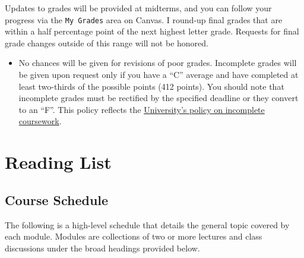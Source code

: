 \documentclass[
]{book}
\newenvironment{rmdblock}[1]
  {\begin{shaded*}
  \begin{itemize}
  \renewcommand{\labelitemi}{
    \raisebox{-.7\height}[0pt][0pt]{
      {\setkeys{Gin}{width=3em,keepaspectratio}\texttt{[image: images/\#1]}}
    }
  }
  \item
  }
  {
  \end{itemize}
  \end{shaded*}
  }
\newenvironment{rmdwarning}
  {\begin{rmdblock}{warning}}
  {\end{rmdblock}}
\begin{document}
Updates to grades will be provided at midterms, and you can follow your progress via the \texttt{My\ Grades} area on Canvas. I round-up final grades that are within a half percentage point of the next highest letter grade. Requests for final grade changes outside of this range will not be honored.

\begin{rmdwarning}
No chances will be given for revisions of poor grades. Incomplete grades
will be given upon request only if you have a ``C'' average and have
completed at least two-thirds of the possible points (412 points). You
should note that incomplete grades must be rectified by the specified
deadline or they convert to an ``F''. This policy reflects the
\href{https://catalog.slu.edu/academic-policies/academic-policies-procedures/incomplete-course/}{University's
policy on incomplete coursework}.
\end{rmdwarning}

\hypertarget{part-reading-list}{%
\part{Reading List}\label{part-reading-list}}

\hypertarget{course-schedule}{%
\chapter{Course Schedule}\label{course-schedule}}

The following is a high-level schedule that details the general topic covered by each module. Modules are collections of two or more lectures and class discussions under the broad headings provided below.
\end{document}
